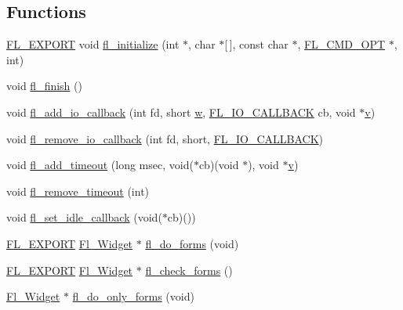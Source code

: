 \subsection*{Functions}
\begin{DoxyCompactItemize}
\item 
\hyperlink{_fl___export_8_h_aa9ba29a18aee9d738370a06eeb4470fc}{F\+L\+\_\+\+E\+X\+P\+O\+RT} void \hyperlink{forms_8_h_a0241d3135d0904e75a3cb9f3eb26c3b2}{fl\+\_\+initialize} (int $\ast$, char $\ast$\mbox{[}$\,$\mbox{]}, const char $\ast$, \hyperlink{forms_8_h_adb22a095935258c59cf827f354a57d4e}{F\+L\+\_\+\+C\+M\+D\+\_\+\+O\+PT} $\ast$, int)
\item 
void \hyperlink{forms_8_h_a28a70e4995e53589c6eb9b417578366b}{fl\+\_\+finish} ()
\item 
void \hyperlink{forms_8_h_ab5b40a8782dd4e56d4ddddb7f536e25d}{fl\+\_\+add\+\_\+io\+\_\+callback} (int fd, short \hyperlink{forms_8_h_aac374e320caaadeca4874add33b62af2}{w}, \hyperlink{forms_8_h_aeb392ff48e699b0f1508e16bd4f9f788}{F\+L\+\_\+\+I\+O\+\_\+\+C\+A\+L\+L\+B\+A\+CK} cb, void $\ast$\hyperlink{forms_8_h_a3b90d5a73541ab9402511d87bed076ef}{v})
\item 
void \hyperlink{forms_8_h_aa4ff0097b7c4e8b622d77383d486bcd7}{fl\+\_\+remove\+\_\+io\+\_\+callback} (int fd, short, \hyperlink{forms_8_h_aeb392ff48e699b0f1508e16bd4f9f788}{F\+L\+\_\+\+I\+O\+\_\+\+C\+A\+L\+L\+B\+A\+CK})
\item 
void \hyperlink{forms_8_h_ad4dabcf09473692a8bba97fd731cfb0f}{fl\+\_\+add\+\_\+timeout} (long msec, void($\ast$cb)(void $\ast$), void $\ast$\hyperlink{forms_8_h_a3b90d5a73541ab9402511d87bed076ef}{v})
\item 
void \hyperlink{forms_8_h_a1623966dc98a2ef6cc57efb299bcb7b1}{fl\+\_\+remove\+\_\+timeout} (int)
\item 
void \hyperlink{forms_8_h_a1d94c68c3e210b585d117321e9be8cc1}{fl\+\_\+set\+\_\+idle\+\_\+callback} (void($\ast$cb)())
\item 
\hyperlink{_fl___export_8_h_aa9ba29a18aee9d738370a06eeb4470fc}{F\+L\+\_\+\+E\+X\+P\+O\+RT} \hyperlink{class_fl___widget}{Fl\+\_\+\+Widget} $\ast$ \hyperlink{forms_8_h_a09ff67831ec79ddf6bfd521a79305566}{fl\+\_\+do\+\_\+forms} (void)
\item 
\hyperlink{_fl___export_8_h_aa9ba29a18aee9d738370a06eeb4470fc}{F\+L\+\_\+\+E\+X\+P\+O\+RT} \hyperlink{class_fl___widget}{Fl\+\_\+\+Widget} $\ast$ \hyperlink{forms_8_h_a93f081992992cdea6591c2ee25bdd191}{fl\+\_\+check\+\_\+forms} ()
\item 
\hyperlink{class_fl___widget}{Fl\+\_\+\+Widget} $\ast$ \hyperlink{forms_8_h_a69f50d7c8d5cce1b1704172bea37de48}{fl\+\_\+do\+\_\+only\+\_\+forms} (void)

\end{DoxyCompactItemize}
